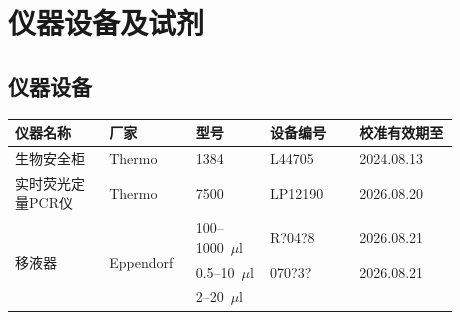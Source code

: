 \documentclass[UTF8,10pt,a4paper,fontset=fandol]{ctexart}
\newcommand{\fieldvalue}[1]{#1}
\newcommand{\handwritten}[1]{#1}
\begin{document}
\vspace{0.5em}

\section{仪器设备及试剂}

\subsection{仪器设备}

\begin{center}
\small
\begin{tabular}{|p{0.19\linewidth}|p{0.16\linewidth}|p{0.15\linewidth}|p{0.18\linewidth}|p{0.20\linewidth}|}
\hline
仪器名称 & 厂家 & 型号 & 设备编号 & 校准有效期至 \\
\hline
生物安全柜 & Thermo & 1384 &
\fieldvalue{\handwritten{L44705}} &
\fieldvalue{\handwritten{2024.08.13}} \\
\hline
实时荧光定量PCR仪 & Thermo & 7500 &
\fieldvalue{\handwritten{LP12190}} &
\fieldvalue{\handwritten{2026.08.20}} \\
\hline
\multirow{4}{*}{移液器} & \multirow{4}{*}{Eppendorf} &
\fieldvalue{\handwritten{100--1000~$\mu$l}} &
\fieldvalue{\handwritten{R?04?8}} &
\fieldvalue{\handwritten{2026.08.21}} \\
\cline{3-5}
& &
\fieldvalue{\handwritten{0.5--10~$\mu$l}} &
\fieldvalue{\handwritten{070?3?}} &
\fieldvalue{\handwritten{2026.08.21}} \\
\cline{3-5}
& &
\fieldvalue{\handwritten{2--20~$\mu$l}} &

\end{tabular}
\end{center}
\end{document}
